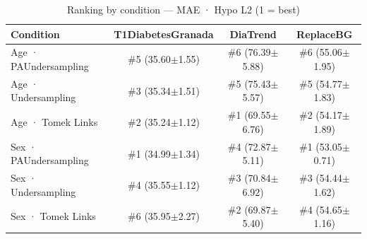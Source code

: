 \begin{table}[htbp]
\centering
\small
\caption{Ranking by condition — MAE · Hypo L2  (1 = best)}
\label{tab:ranking_mae_tbr_2_family_size_undersampling}
\begin{tabular}{lccc}
\toprule
\textbf{Condition} & \textbf{T1DiabetesGranada} & \textbf{DiaTrend} & \textbf{ReplaceBG} \\
\midrule
Age · PAUndersampling & \#5 (35.60$\pm$1.55) & \#6 (76.39$\pm$5.88) & \#6 (55.06$\pm$1.95) \\
Age · Undersampling & \#3 (35.34$\pm$1.51) & \#5 (75.43$\pm$5.57) & \#5 (54.77$\pm$1.83) \\
Age · Tomek Links & \#2 (35.24$\pm$1.12) & \#1 (69.55$\pm$6.76) & \#2 (54.17$\pm$1.89) \\
\midrule
Sex · PAUndersampling & \#1 (34.99$\pm$1.34) & \#4 (72.87$\pm$5.11) & \#1 (53.05$\pm$0.71) \\
Sex · Undersampling & \#4 (35.55$\pm$1.12) & \#3 (70.84$\pm$6.92) & \#3 (54.44$\pm$1.62) \\
Sex · Tomek Links & \#6 (35.95$\pm$2.27) & \#2 (69.87$\pm$5.40) & \#4 (54.65$\pm$1.16) \\
\bottomrule
\end{tabular}
\end{table}